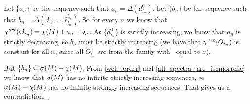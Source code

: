 Let $\{a_n\}$ be the sequence such that $a_n = \Delta(d^0_{i_n})$.
Let $\{b_n\}$ be the sequence such that $b_n = \Delta(d^1_{i_n},
\cdots, b^{l_{i_n}}_{i_n})$. 
So for every $n$ we know that ${\chi^{orb}(O_{i_n})} = \chi(M) + a_n + b_n$. As $\{d^0_{i_n}\}$ 
is strictly 
increasing, we know 
that $a_n$ is strictly decreasing, so $b_n$ must be strictly 
increasing  
(we have that ${\chi^{orb}(O_{i_n})}$ is constant for all $n$, since all $O_{i_n}$ 
are from the family with \Eoc\ equal to $x$). 

But $\{b_n\} \subseteq {{\sigma}(M)} - \chi(M)$. 
From \ref{well_order} and \ref{all_spectra_are_isomorphic} we know that ${{\sigma}(M)}$ has no infinite 
strictly increasing sequences, so 
${{\sigma}(M)} - \chi(M)$ has no infinite strongly increasing sequences. That gives us a 
contradiction. 
$_\square$ 



